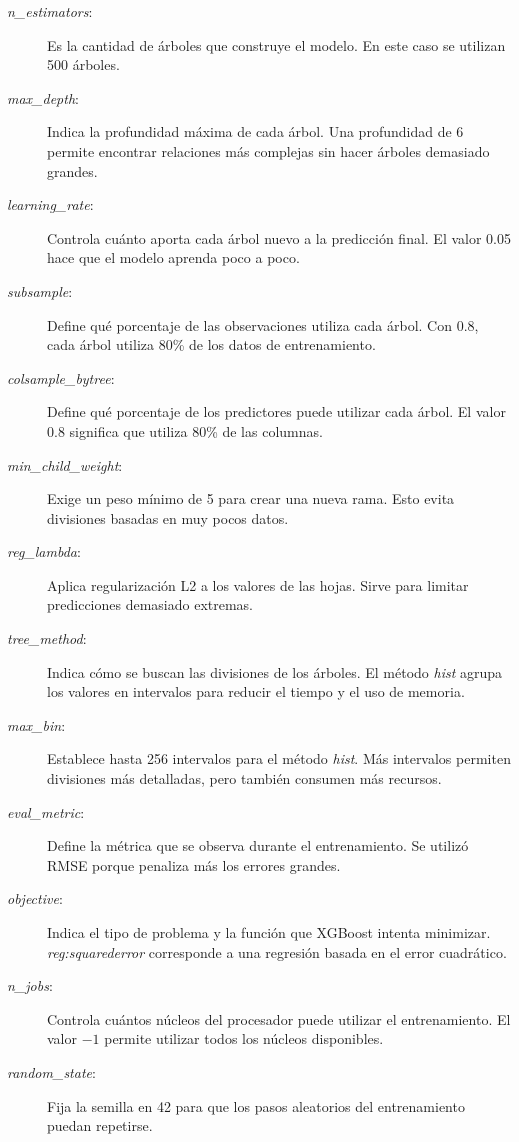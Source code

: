 \documentclass[a4paper,12pt,twocolumn]{report}
\begin{document}
\begin{description}
	\item[\textit{n\_estimators}:] Es la cantidad de árboles que construye el modelo. En este caso se utilizan 500 árboles.
	\item[\textit{max\_depth}:] Indica la profundidad máxima de cada árbol. Una profundidad de 6 permite encontrar relaciones más complejas sin hacer árboles demasiado grandes.
	\item[\textit{learning\_rate}:] Controla cuánto aporta cada árbol nuevo a la predicción final. El valor 0.05 hace que el modelo aprenda poco a poco.
	\item[\textit{subsample}:] Define qué porcentaje de las observaciones utiliza cada árbol. Con 0.8, cada árbol utiliza 80\% de los datos de entrenamiento.
	\item[\textit{colsample\_bytree}:] Define qué porcentaje de los predictores puede utilizar cada árbol. El valor 0.8 significa que utiliza 80\% de las columnas.
	\item[\textit{min\_child\_weight}:] Exige un peso mínimo de 5 para crear una nueva rama. Esto evita divisiones basadas en muy pocos datos.
	\item[\textit{reg\_lambda}:] Aplica regularización L2 a los valores de las hojas. Sirve para limitar predicciones demasiado extremas.
	\item[\textit{tree\_method}:] Indica cómo se buscan las divisiones de los árboles. El método \textit{hist} agrupa los valores en intervalos para reducir el tiempo y el uso de memoria.
	\item[\textit{max\_bin}:] Establece hasta 256 intervalos para el método \textit{hist}. Más intervalos permiten divisiones más detalladas, pero también consumen más recursos.
	\item[\textit{eval\_metric}:] Define la métrica que se observa durante el entrenamiento. Se utilizó RMSE porque penaliza más los errores grandes.
	\item[\textit{objective}:] Indica el tipo de problema y la función que XGBoost intenta minimizar. \textit{reg:squarederror} corresponde a una regresión basada en el error cuadrático.
	\item[\textit{n\_jobs}:] Controla cuántos núcleos del procesador puede utilizar el entrenamiento. El valor $-1$ permite utilizar todos los núcleos disponibles.
	\item[\textit{random\_state}:] Fija la semilla en 42 para que los pasos aleatorios del entrenamiento puedan repetirse.
\end{description}
\end{document}
